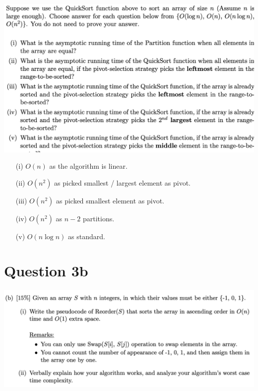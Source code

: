 \documentclass{article}
\begin{document}
\begin{center}
    \includegraphics[width=\linewidth]{img/3a.png}
\end{center}

\begin{enumerate}
    \item[(i)] $O(n)$ as the algorithm is linear.
    \item[(ii)] $O(n^2)$ as picked smallest / largest element as pivot.
    \item[(iii)] $O(n^2)$ as picked smallest element as pivot.
    \item[(iv)] $O(n^2)$ as $n-2$ partitions.
    \item[(v)] $O(n \log n)$ as standard.
\end{enumerate}

\section*{Question 3b}

\begin{center}
    \includegraphics[width=\linewidth]{img/3b.png}
\end{center}


\end{document}
